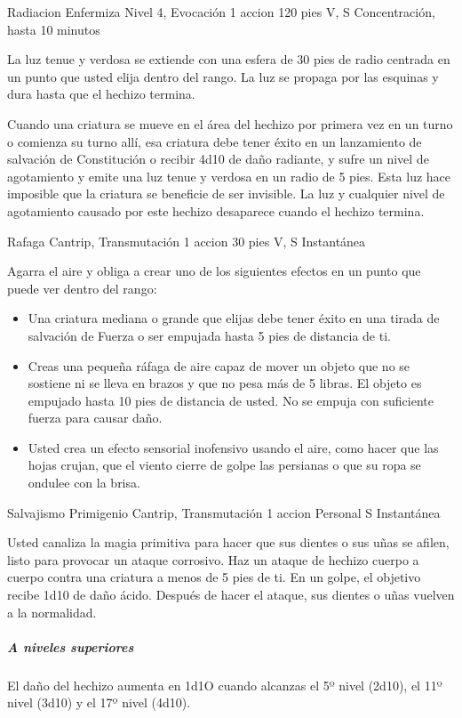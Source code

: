 \documentclass[a4paper,twocolumn,openany,10pt]{dndbook}
\begin{document}
\spellheader%
	{Radiacion Enfermiza}
	{Nivel 4, Evocación}
	{1 accion}
	{120 pies}
	{V, S}
	{Concentración, hasta 10 minutos}
	
	La luz tenue y verdosa se extiende con una esfera de 30 pies de radio centrada en un punto que usted elija dentro del rango.
	La luz se propaga por las esquinas y dura hasta que el hechizo termina.
	
	Cuando una criatura se mueve en el área del hechizo por primera vez en un turno o comienza su turno allí, esa criatura debe
	tener éxito en un lanzamiento de salvación de Constitución o recibir 4d10 de daño radiante, y sufre un nivel de agotamiento
	y emite una luz tenue y verdosa en un radio de 5 pies. Esta luz hace imposible que la criatura se beneficie de ser
	invisible. La luz y cualquier nivel de agotamiento causado por este hechizo desaparece cuando el hechizo termina. 

\spellheader%
	{Rafaga}
	{Cantrip, Transmutación}
	{1 accion }
	{30 pies}
	{V, S}
	{Instantánea}
	
	Agarra el aire y obliga a crear uno de los siguientes efectos en un punto que puede ver dentro del rango:
	\begin{itemize}
		\item Una criatura mediana o grande que elijas debe tener éxito en una tirada de salvación de Fuerza o ser empujada
		hasta 5 pies de distancia de ti.
		\item Creas una pequeña ráfaga de aire capaz de mover un objeto que no se sostiene ni se lleva en brazos y que no pesa
		más de 5 libras. El objeto es empujado hasta 10 pies de distancia de usted. No se empuja con suficiente fuerza para
		causar daño.
		\item Usted crea un efecto sensorial inofensivo usando el aire, como hacer que las hojas crujan, que el viento cierre de
		golpe las persianas o que su ropa se ondulee con la brisa.
	\end{itemize}

\spellheader%
	{Salvajismo Primigenio}
	{Cantrip, Transmutación}
	{1 accion }
	{Personal}
	{S}
	{Instantánea}
	
	Usted canaliza la magia primitiva para hacer que sus dientes o sus uñas se afilen, listo para provocar un ataque corrosivo.
	Haz un ataque de hechizo cuerpo a cuerpo contra una criatura a menos de 5 pies de ti. En un golpe, el objetivo recibe 1d10
	de daño ácido. Después de hacer el ataque, sus dientes o uñas vuelven a la normalidad.

	\subparagraph{A niveles superiores} El daño del hechizo aumenta en 1d1O cuando alcanzas el 5º nivel (2d10), el 11º nivel
	(3d10) y el 17º nivel (4d10). 
\end{document}
